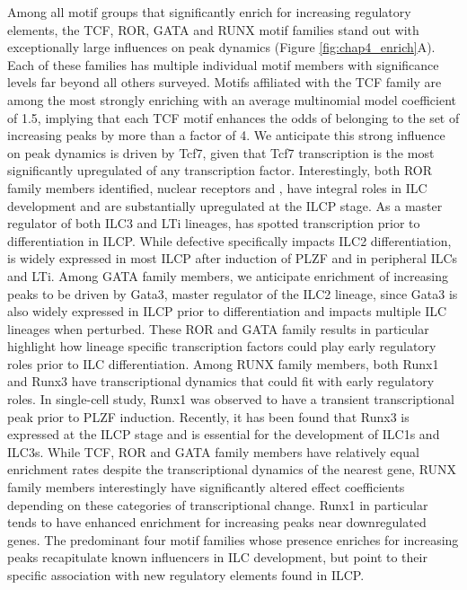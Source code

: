 Among all motif groups that significantly enrich for increasing regulatory elements, the TCF, ROR, GATA and RUNX motif families stand out with exceptionally large influences on peak dynamics (Figure \ref{fig:chap4_enrich}A). Each of these families has multiple individual motif members with significance levels far beyond all others surveyed. Motifs affiliated with the TCF family are among the most strongly enriching with an average multinomial model coefficient of 1.5, implying that each TCF motif enhances the odds of belonging to the set of increasing peaks by more than a factor of 4. We anticipate this strong influence on peak dynamics is driven by Tcf7, given that Tcf7 transcription is the most significantly upregulated of any transcription factor. Interestingly, both ROR family members identified, nuclear receptors \RORa{} and \RORgt, have integral roles in ILC development and are substantially upregulated at the ILCP stage. As a master regulator of both ILC3 and LTi lineages, \RORgt{} has spotted transcription prior to differentiation in ILCP. While defective \RORa{} specifically impacts ILC2 differentiation, \RORa{} is widely expressed in most ILCP after induction of PLZF and in peripheral ILCs and LTi. Among GATA family members, we anticipate enrichment of increasing peaks to be driven by Gata3, master regulator of the ILC2 lineage, since Gata3 is also widely expressed in ILCP prior to differentiation and impacts multiple ILC lineages when perturbed. These ROR and GATA family results in particular highlight how lineage specific transcription factors could play early regulatory roles prior to ILC differentiation. Among RUNX family members, both Runx1 and Runx3 have transcriptional dynamics that could fit with early regulatory roles. In single-cell study, Runx1 was observed to have a transient transcriptional peak prior to PLZF induction. Recently, it has been found that Runx3 is expressed at the ILCP stage and is essential for the development of ILC1s and ILC3s. While TCF, ROR and GATA family members have relatively equal enrichment rates despite the transcriptional dynamics of the nearest gene, RUNX family members interestingly have significantly altered effect coefficients depending on these categories of transcriptional change. Runx1 in particular tends to have enhanced enrichment for increasing peaks near downregulated genes. The predominant four motif families whose presence enriches for increasing peaks recapitulate known influencers in ILC development, but point to their specific association with new regulatory elements found in ILCP.

